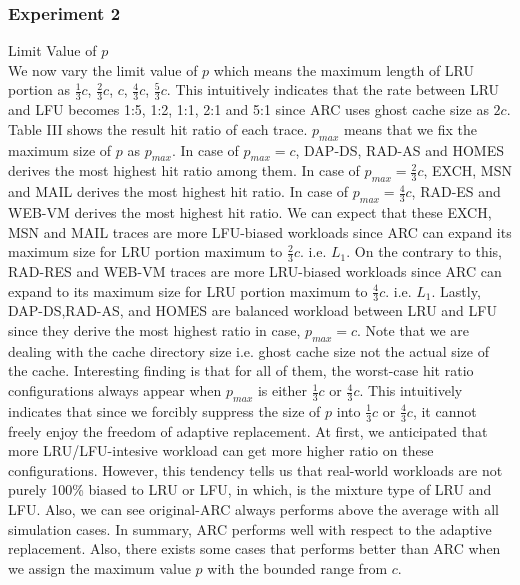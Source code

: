 \subsubsection{Experiment 2} Limit Value of $p$ \\
We now vary the limit value of $p$ which means the maximum length of LRU portion as $\frac{1}{3}c$, $\frac{2}{3}c$, $c$, $\frac{4}{3}c$, $\frac{5}{3}c$. This intuitively indicates that the rate between LRU and LFU becomes 1:5, 1:2, 1:1, 2:1 and 5:1 since ARC uses ghost cache size as $2c$. Table III shows the result hit ratio of each trace. $p_{max}$ means that we fix the maximum size of $p$ as $p_{max}$. In case of $p_{max}=c$, DAP-DS, RAD-AS and HOMES derives the most highest hit ratio among them. In case of $p_{max}=\frac{2}{3}c$, EXCH, MSN and MAIL derives the most highest hit ratio. In case of $p_{max}=\frac{4}{3}c$, RAD-ES and WEB-VM derives the most highest hit ratio. We can expect that these EXCH, MSN and MAIL traces are more LFU-biased workloads since ARC can expand its maximum size for LRU portion maximum to $\frac{2}{3}c$. i.e. $L_1$. On the contrary to this, RAD-RES and WEB-VM traces are more LRU-biased workloads since ARC can expand to its maximum size for LRU portion maximum to $\frac{4}{3}c$. i.e. $L_1$. Lastly, DAP-DS,RAD-AS, and HOMES are balanced workload between LRU and LFU since they derive the most highest ratio in case, $p_{max}=c$. Note that we are dealing with the cache directory size i.e. ghost cache size not the actual size of the cache. Interesting finding is that for all of them, the worst-case hit ratio configurations always appear when $p_{max}$ is either $\frac{1}{3}c$ or $\frac{4}{3}c$. This intuitively indicates that since we forcibly suppress the size of $p$ into $\frac{1}{3}c$ or $\frac{4}{3}c$, it cannot freely enjoy the freedom of adaptive replacement. At first, we anticipated that more LRU/LFU-intesive workload can get more higher ratio on these configurations. However, this tendency tells us that real-world workloads are not purely 100\% biased to LRU or LFU, in which, is the mixture type of LRU and LFU. Also, we can see original-ARC always performs above the average with all simulation cases. In summary, ARC performs well with respect to the adaptive replacement. Also, there exists some cases that performs better than ARC when we assign the maximum value $p$ with the bounded range from $c$.


\vspace{0.2cm}
